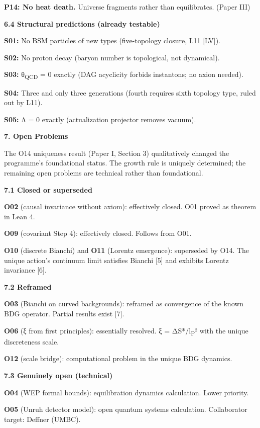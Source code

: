 \documentclass[12pt,a4paper]{article}
\begin{document}
\textbf{P14: No heat death.} Universe fragments rather than
equilibrates. (Paper III)

\textbf{6.4 Structural predictions (already testable)}

\textbf{S01:} No BSM particles of new types (five-topology closure, L11
{[}LV{]}).

\textbf{S02:} No proton decay (baryon number is topological, not
dynamical).

\textbf{S03:} θ\textsubscript{QCD} = 0 exactly (DAG acyclicity forbids
instantons; no axion needed).

\textbf{S04:} Three and only three generations (fourth requires sixth
topology type, ruled out by L11).

\textbf{S05:} Λ = 0 exactly (actualization projector removes vacuum).

\textbf{7. Open Problems}

The O14 uniqueness result (Paper I, Section 3) qualitatively changed the
programme's foundational status. The growth rule is uniquely determined;
the remaining open problems are technical rather than foundational.

\textbf{7.1 Closed or superseded}

\textbf{O02} (causal invariance without axiom): effectively closed. O01
proved as theorem in Lean 4.

\textbf{O09} (covariant Step 4): effectively closed. Follows from O01.

\textbf{O10} (discrete Bianchi) and \textbf{O11} (Lorentz emergence):
superseded by O14. The unique action's continuum limit satisfies Bianchi
{[}5{]} and exhibits Lorentz invariance {[}6{]}.

\textbf{7.2 Reframed}

\textbf{O03} (Bianchi on curved backgrounds): reframed as convergence of
the known BDG operator. Partial results exist {[}7{]}.

\textbf{O06} (ξ from first principles): essentially resolved. ξ =
ΔS*/l\textsubscript{P}² with the unique discreteness scale.

\textbf{O12} (scale bridge): computational problem in the unique BDG
dynamics.

\textbf{7.3 Genuinely open (technical)}

\textbf{O04} (WEP formal bounds): equilibration dynamics calculation.
Lower priority.

\textbf{O05} (Unruh detector model): open quantum systems calculation.
Collaborator target: Deffner (UMBC).
\end{document}
